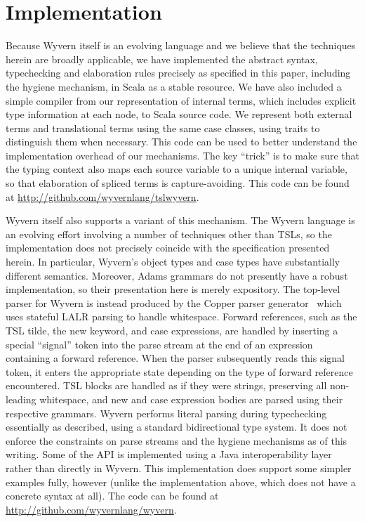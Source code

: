 
\section{Implementation}
\label{s:implementation}
Because Wyvern itself is an evolving language and we believe that the techniques herein are broadly applicable, we have implemented the abstract syntax, typechecking and elaboration rules precisely as specified in this paper, including the hygiene mechanism, in Scala as a stable resource. We have also included a simple compiler from our representation of internal terms, which includes explicit type information at each node, to Scala source code. We represent both external terms and translational terms using the same case classes, using traits to distinguish them when necessary. This code can be used to better understand the implementation overhead of our mechanisms. The key ``trick'' is to make sure that the typing context also maps each source variable to a unique internal variable, so that elaboration of spliced terms is capture-avoiding. This code can be found at \url{http://github.com/wyvernlang/tslwyvern}.

Wyvern itself also supports a variant of this mechanism. The Wyvern language is an evolving effort involving a number of techniques other than TSLs, so the implementation does not precisely coincide with the specification presented herein. In particular, Wyvern's object types and case types have substantially different semantics. Moreover, Adams grammars do not presently have a robust implementation, so their presentation here is merely expository. The top-level parser for Wyvern is instead produced by the Copper parser generator~\cite{van2007context}
which uses stateful LALR parsing to handle whitespace. Forward references, such as the TSL tilde, the new keyword, and case expressions, are handled by inserting a special ``signal'' token into the parse stream at the end of an expression containing a forward reference. When the parser subsequently reads this signal token, it enters the appropriate state depending on the type of forward reference encountered. TSL blocks are handled as if they were strings, preserving all non-leading whitespace, and new and case expression bodies are parsed using their respective grammars. Wyvern performs literal parsing during typechecking essentially as described, using a standard bidirectional type system. It does not enforce the constraints on parse streams and the hygiene mechanisms as of this writing. Some of the API is implemented using a Java interoperability layer rather than directly in Wyvern. This implementation does support some simpler examples fully, however (unlike the implementation above, which does not have a concrete syntax at all). The code can be found at \url{http://github.com/wyvernlang/wyvern}. 

